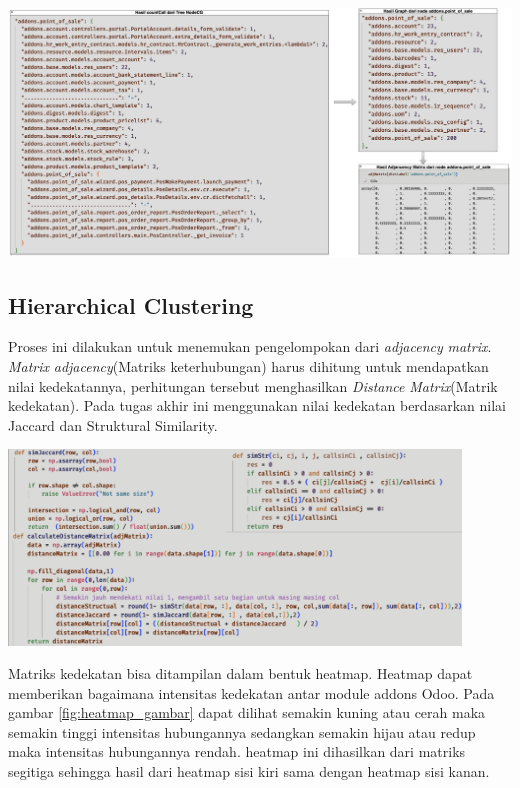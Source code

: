 \begin{center}
	\includegraphics[width=14cm]{img/bab_4/optimisasi_5.png}
	\label{fig:optimasi_5}
\end{center}


\subsection{Hierarchical Clustering}
Proses ini dilakukan untuk menemukan pengelompokan dari \textit{adjacency} \textit{matrix}. \textit{Matrix} \textit{adjacency}(Matriks keterhubungan) harus dihitung untuk mendapatkan nilai kedekatannya, perhitungan tersebut menghasilkan \textit{Distance} \textit{Matrix}(Matrik kedekatan). Pada tugas akhir ini menggunakan nilai kedekatan berdasarkan nilai Jaccard dan Struktural Similarity. 

\begin{center}
	\includegraphics[width=12cm]{img/bab_4/hc_1.png}
	\label{fig:hc_1}
\end{center}

Matriks kedekatan bisa ditampilan dalam bentuk heatmap. Heatmap dapat memberikan bagaimana intensitas kedekatan antar module addons Odoo. Pada gambar \ref{fig:heatmap_gambar} dapat dilihat semakin kuning atau cerah maka semakin tinggi intensitas hubungannya sedangkan semakin hijau atau redup maka intensitas hubungannya rendah. heatmap ini dihasilkan dari matriks segitiga sehingga hasil dari heatmap sisi kiri sama dengan heatmap sisi kanan.

